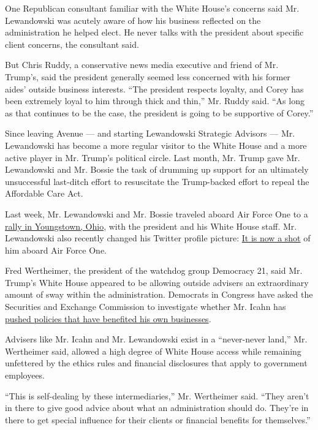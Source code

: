One Republican consultant familiar with the White House's concerns said
Mr. Lewandowski was acutely aware of how his business reflected on the
administration he helped elect. He never talks with the president about
specific client concerns, the consultant said.

But Chris Ruddy, a conservative news media executive and friend of Mr.
Trump's, said the president generally seemed less concerned with his
former aides' outside business interests. ``The president respects
loyalty, and Corey has been extremely loyal to him through thick and
thin,'' Mr. Ruddy said. ``As long as that continues to be the case, the
president is going to be supportive of Corey.''

Since leaving Avenue --- and starting Lewandowski Strategic Advisors ---
Mr. Lewandowski has become a more regular visitor to the White House and
a more active player in Mr. Trump's political circle. Last month, Mr.
Trump gave Mr. Lewandowski and Mr. Bossie the task of drumming up
support for an ultimately unsuccessful last-ditch effort to resuscitate
the Trump-backed effort to repeal the Affordable Care Act.

Last week, Mr. Lewandowski and Mr. Bossie traveled aboard Air Force One
to a
\href{https://www.nytimes.com/2017/07/25/us/politics/trump-ohio-rally.html}{rally
in Youngstown, Ohio}, with the president and his White House staff. Mr.
Lewandowski also recently changed his Twitter profile picture:
\href{https://twitter.com/CLewandowski_}{It is now a shot} of him aboard
Air Force One.

Fred Wertheimer, the president of the watchdog group Democracy 21, said
Mr. Trump's White House appeared to be allowing outside advisers an
extraordinary amount of sway within the administration. Democrats in
Congress have asked the Securities and Exchange Commission to
investigate whether Mr. Icahn has
\href{https://www.nytimes.com/2017/05/09/business/dealbook/carl-icahn-scrutinized-for-shaping-policy-that-helped-him-profit.html}{pushed
policies that have benefited his own businesses}.

Advisers like Mr. Icahn and Mr. Lewandowski exist in a ``never-never
land,'' Mr. Wertheimer said, allowed a high degree of White House access
while remaining unfettered by the ethics rules and financial disclosures
that apply to government employees.

``This is self-dealing by these intermediaries,'' Mr. Wertheimer said.
``They aren't in there to give good advice about what an administration
should do. They're in there to get special influence for their clients
or financial benefits for themselves.''

